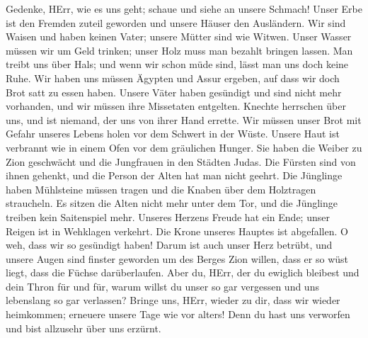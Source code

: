  Gedenke, HErr, wie es uns geht; schaue und siehe an unsere
Schmach!  Unser Erbe ist den Fremden zuteil geworden und
unsere Häuser den Ausländern.  Wir sind Waisen und haben
keinen Vater; unsere Mütter sind wie Witwen.  Unser Wasser
müssen wir um Geld trinken; unser Holz muss man bezahlt bringen lassen.
 Man treibt uns über Hals; und wenn wir schon müde sind,
lässt man uns doch keine Ruhe.  Wir haben uns müssen Ägypten
und Assur ergeben, auf dass wir doch Brot satt zu essen haben.
 Unsere Väter haben gesündigt und sind nicht mehr vorhanden,
und wir müssen ihre Missetaten entgelten.  Knechte herrschen
über uns, und ist niemand, der uns von ihrer Hand errette. 
Wir müssen unser Brot mit Gefahr unseres Lebens holen vor dem Schwert in
der Wüste.  Unsere Haut ist verbrannt wie in einem Ofen vor
dem gräulichen Hunger.  Sie haben die Weiber zu Zion
geschwächt und die Jungfrauen in den Städten Judas.  Die
Fürsten sind von ihnen gehenkt, und die Person der Alten hat man nicht
geehrt.  Die Jünglinge haben Mühlsteine müssen tragen und
die Knaben über dem Holztragen straucheln.  Es sitzen die
Alten nicht mehr unter dem Tor, und die Jünglinge treiben kein
Saitenspiel mehr.  Unseres Herzens Freude hat ein Ende;
unser Reigen ist in Wehklagen verkehrt.  Die Krone unseres
Hauptes ist abgefallen. O weh, dass wir so gesündigt haben!
 Darum ist auch unser Herz betrübt, und unsere Augen sind
finster geworden  um des Berges Zion willen, dass er so
wüst liegt, dass die Füchse darüberlaufen.  Aber du, HErr,
der du ewiglich bleibest und dein Thron für und für,  warum
willst du unser so gar vergessen und uns lebenslang so gar verlassen?
 Bringe uns, HErr, wieder zu dir, dass wir wieder
heimkommen; erneuere unsere Tage wie vor alters!  Denn du
hast uns verworfen und bist allzusehr über uns erzürnt.
